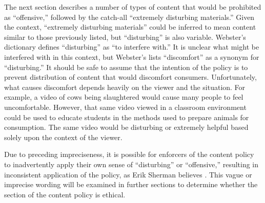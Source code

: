 \documentclass[11pt]{article}
\begin{document}
\begin{multicols}{2}
The next section describes a number of types of content that would be prohibited as ``offensive,'' followed by the catch-all ``extremely disturbing materials.'' Given the context, ``extremely disturbing materials'' could be inferred to mean content similar to those previously listed, but ``disturbing'' is also variable.  Webster's dictionary defines ``disturbing'' as ``to interfere with.'' \cite{WebsterOnlineDict}  It is unclear what might be interfered with in this context, but Webster's lists ``discomfort'' as a synonym for ``disturbing.''  It should be safe to assume that the intention of the policy is to prevent distribution of content that would discomfort consumers.  Unfortunately, what causes discomfort depends heavily on the viewer and the situation.  For example, a video of cows being slaughtered would cause many people to feel uncomfortable.  However, that same video viewed in a classroom environment could be used to educate students in the methods used to prepare animals for consumption.  The same video would be disturbing or extremely helpful based solely upon the context of the viewer. 

Due to preceding impreciseness, it is possible for enforcers of the content policy to inadvertently apply their own sense of ``disturbing'' or ``offensive,'' resulting in inconsistent application of the policy, as Erik Sherman believes \cite{ShermanAmazonExecs}.  This vague or imprecise wording will be examined in further sections to determine whether the section of the content policy is ethical.



\end{multicols}
\end{document}
